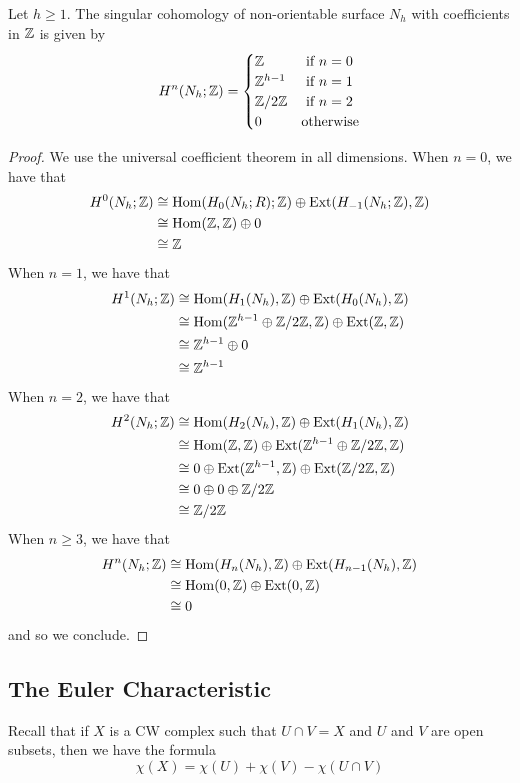 \documentclass[a4paper]{article}
\begin{document}
\begin{prp}{}{} Let $h\geq 1$. The singular cohomology of non-orientable surface $N_h$ with coefficients in $\mathbb{Z}$ is given by $$H^n(N_h;\mathbb{Z})=\begin{cases}
\mathbb{Z} & \text{ if } n=0\\
\mathbb{Z}^{h-1} & \text{ if } n=1\\
\mathbb{Z}/2\mathbb{Z} & \text{ if } n=2\\
0 & \text{otherwise}
\end{cases}$$ \tcbline
\begin{proof}
We use the universal coefficient theorem in all dimensions. 
When $n=0$, we have that 
\begin{align*}
H^0(N_h;\mathbb{Z})&\cong\operatorname{Hom}(H_0(N_h;R);\mathbb{Z})\oplus\text{Ext}(H_{-1}(N_h;\mathbb{Z}),\mathbb{Z})\\
&\cong\operatorname{Hom}(\mathbb{Z},\mathbb{Z})\oplus 0\\
&\cong\mathbb{Z}
\end{align*}
When $n=1$, we have that 
\begin{align*}
H^1(N_h;\mathbb{Z})&\cong\operatorname{Hom}(H_1(N_h),\mathbb{Z})\oplus\text{Ext}(H_0(N_h),\mathbb{Z})\\
&\cong\operatorname{Hom}(\mathbb{Z}^{h-1}\oplus\mathbb{Z}/2\mathbb{Z},\mathbb{Z})\oplus\text{Ext}(\mathbb{Z},\mathbb{Z})\\
&\cong\mathbb{Z}^{h-1}\oplus 0\\
&\cong\mathbb{Z}^{h-1}
\end{align*}
When $n=2$, we have that 
\begin{align*}
H^2(N_h;\mathbb{Z})&\cong\operatorname{Hom}(H_2(N_h),\mathbb{Z})\oplus\text{Ext}(H_1(N_h),\mathbb{Z})\\
&\cong\operatorname{Hom}(\mathbb{Z},\mathbb{Z})\oplus\text{Ext}(\mathbb{Z}^{h-1}\oplus\mathbb{Z}/2\mathbb{Z},\mathbb{Z})\\
&\cong 0\oplus\text{Ext}(\mathbb{Z}^{h-1},\mathbb{Z})\oplus\text{Ext}(\mathbb{Z}/2\mathbb{Z},\mathbb{Z})\\
&\cong 0\oplus 0\oplus \mathbb{Z}/2\mathbb{Z}\\
&\cong\mathbb{Z}/2\mathbb{Z}
\end{align*}
When $n\geq 3$, we have that 
\begin{align*}
H^n(N_h;\mathbb{Z})&\cong\operatorname{Hom}(H_n(N_h),\mathbb{Z})\oplus\text{Ext}(H_{n-1}(N_h),\mathbb{Z})\\
&\cong\operatorname{Hom}(0,\mathbb{Z})\oplus\text{Ext}(0,\mathbb{Z})\\
&\cong 0
\end{align*}
and so we conclude. 
\end{proof}
\end{prp}

\subsection{The Euler Characteristic}
Recall that if $X$ is a CW complex such that $U\cap V=X$ and $U$ and $V$ are open subsets, then we have the formula $$\chi(X)=\chi(U)+\chi(V)-\chi(U\cap V)$$
\end{document}
